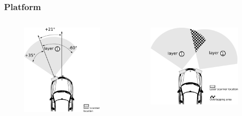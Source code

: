 \documentclass{beamer}
\begin{document}
	\begin{frame}
		\frametitle{Platform}	
		 \begin{columns}[t]
		  \begin{column}{5cm}
		  \begin{figure}[h]
			\center
			\includegraphics[scale=0.3]{../img/fig:demonstrator:superior}
		  \end{figure}
		  \end{column}
		  
		  \begin{column}{5cm}
		  \begin{figure}[h]
			\center
			\includegraphics[scale=0.3]{../img/fig:demonstrator:superior:overlap}
		  \end{figure}   
		  \end{column}
		 \end{columns} 	
	

\end{frame}
\end{document}
